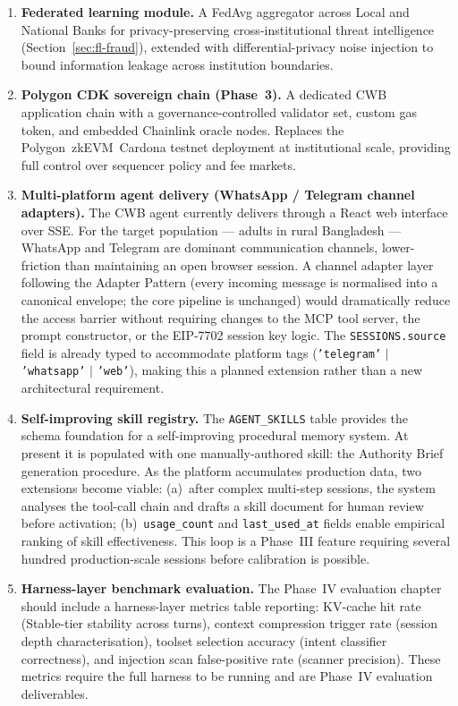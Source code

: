 \documentclass[12pt,a4paper]{report}
\begin{document}
\begin{enumerate}[noitemsep]
\item \textbf{Federated learning module.} A FedAvg aggregator across Local and National Banks for privacy-preserving cross-institutional threat intelligence (Section~\ref{sec:fl-fraud}), extended with differential-privacy noise injection to bound information leakage across institution boundaries.

\item \textbf{Polygon CDK sovereign chain (Phase~3).} A dedicated CWB application chain with a governance-controlled validator set, custom gas token, and embedded Chainlink oracle nodes. Replaces the Polygon~zkEVM~Cardona testnet deployment at institutional scale, providing full control over sequencer policy and fee markets.

\item \textbf{Multi-platform agent delivery (WhatsApp / Telegram channel adapters).}
The CWB agent currently delivers through a React web interface over SSE. For the
target population --- adults in rural Bangladesh --- WhatsApp and Telegram are
dominant communication channels, lower-friction than maintaining an open browser
session. A channel adapter layer following the Adapter Pattern (every incoming
message is normalised into a canonical envelope; the core pipeline is unchanged)
would dramatically reduce the access barrier without requiring changes to the MCP
tool server, the prompt constructor, or the EIP-7702 session key logic. The
\texttt{SESSIONS.source} field is already typed to accommodate platform tags
(\texttt{'telegram'} $|$ \texttt{'whatsapp'} $|$ \texttt{'web'}), making this a
planned extension rather than a new architectural requirement.

\item \textbf{Self-improving skill registry.} The \texttt{AGENT\_SKILLS} table
provides the schema foundation for a self-improving procedural memory system. At
present it is populated with one manually-authored skill: the Authority Brief
generation procedure. As the platform accumulates production data, two extensions
become viable: (a)~after complex multi-step sessions, the system analyses the
tool-call chain and drafts a skill document for human review before activation;
(b)~\texttt{usage\_count} and \texttt{last\_used\_at} fields enable empirical
ranking of skill effectiveness. This loop is a Phase~III feature requiring several
hundred production-scale sessions before calibration is possible.

\item \textbf{Harness-layer benchmark evaluation.} The Phase~IV evaluation chapter
should include a harness-layer metrics table reporting: KV-cache hit rate
(Stable-tier stability across turns), context compression trigger rate (session
depth characterisation), toolset selection accuracy (intent classifier correctness),
and injection scan false-positive rate (scanner precision). These metrics require
the full harness to be running and are Phase~IV evaluation deliverables.


\end{enumerate}
\end{document}

